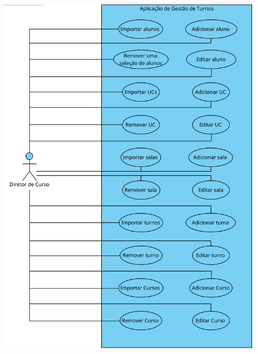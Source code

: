 \documentclass[a4paper,12pt]{scrreprt}
\begin{document}
\begin{minipage}{\textwidth}
    \centering
    \includegraphics[width=1\textwidth]{images/use-cases-diagrams/2-gestao-alunos-cursos-ucs-turnos-salas.png}
    \label{fig:2-2-diagrama_de_casos_de_uso_gestao_de_alunos_cursos_ucs_turnos_e_salas}
\end{minipage}
\end{document}
